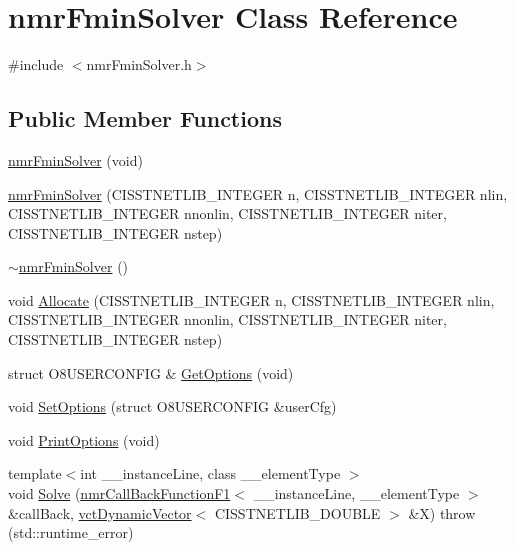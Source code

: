 \hypertarget{classnmr_fmin_solver}{}\section{nmr\+Fmin\+Solver Class Reference}
\label{classnmr_fmin_solver}


{\ttfamily \#include $<$nmr\+Fmin\+Solver.\+h$>$}

\subsection*{Public Member Functions}
\begin{DoxyCompactItemize}
\item 
\hyperlink{classnmr_fmin_solver_a85595f69959139e1cb81d4086fadcc08}{nmr\+Fmin\+Solver} (void)
\item 
\hyperlink{classnmr_fmin_solver_a40c8467dd19a70eee7789b4c59300da0}{nmr\+Fmin\+Solver} (C\+I\+S\+S\+T\+N\+E\+T\+L\+I\+B\+\_\+\+I\+N\+T\+E\+G\+E\+R n, C\+I\+S\+S\+T\+N\+E\+T\+L\+I\+B\+\_\+\+I\+N\+T\+E\+G\+E\+R nlin, C\+I\+S\+S\+T\+N\+E\+T\+L\+I\+B\+\_\+\+I\+N\+T\+E\+G\+E\+R nnonlin, C\+I\+S\+S\+T\+N\+E\+T\+L\+I\+B\+\_\+\+I\+N\+T\+E\+G\+E\+R niter, C\+I\+S\+S\+T\+N\+E\+T\+L\+I\+B\+\_\+\+I\+N\+T\+E\+G\+E\+R nstep)
\item 
\hyperlink{classnmr_fmin_solver_a67649282c5176c615e72c3a0fe30a1c9}{$\sim$nmr\+Fmin\+Solver} ()
\item 
void \hyperlink{classnmr_fmin_solver_a45785e934e8cca9db41d55445b898f02}{Allocate} (C\+I\+S\+S\+T\+N\+E\+T\+L\+I\+B\+\_\+\+I\+N\+T\+E\+G\+E\+R n, C\+I\+S\+S\+T\+N\+E\+T\+L\+I\+B\+\_\+\+I\+N\+T\+E\+G\+E\+R nlin, C\+I\+S\+S\+T\+N\+E\+T\+L\+I\+B\+\_\+\+I\+N\+T\+E\+G\+E\+R nnonlin, C\+I\+S\+S\+T\+N\+E\+T\+L\+I\+B\+\_\+\+I\+N\+T\+E\+G\+E\+R niter, C\+I\+S\+S\+T\+N\+E\+T\+L\+I\+B\+\_\+\+I\+N\+T\+E\+G\+E\+R nstep)
\item 
struct O8\+U\+S\+E\+R\+C\+O\+N\+F\+I\+G \& \hyperlink{classnmr_fmin_solver_a98c569b9d97ad5b39925a19ac78cf7a1}{Get\+Options} (void)
\item 
void \hyperlink{classnmr_fmin_solver_a76f1b98e70619d84258af750561d5cfb}{Set\+Options} (struct O8\+U\+S\+E\+R\+C\+O\+N\+F\+I\+G \&user\+Cfg)
\item 
void \hyperlink{classnmr_fmin_solver_a914f7b5c2001ef16dc990d3631bf5685}{Print\+Options} (void)
\item 
{\footnotesize template$<$int \+\_\+\+\_\+instance\+Line, class \+\_\+\+\_\+element\+Type $>$ }\\void \hyperlink{classnmr_fmin_solver_a4028e6d3a6d765870fddcd5a388b4a57}{Solve} (\hyperlink{classnmr_call_back_function_f1}{nmr\+Call\+Back\+Function\+F1}$<$ \+\_\+\+\_\+instance\+Line, \+\_\+\+\_\+element\+Type $>$ \&call\+Back, \hyperlink{classvct_dynamic_vector}{vct\+Dynamic\+Vector}$<$ C\+I\+S\+S\+T\+N\+E\+T\+L\+I\+B\+\_\+\+D\+O\+U\+B\+L\+E $>$ \&X)  throw (std\+::runtime\+\_\+error)

\end{DoxyCompactItemize}
